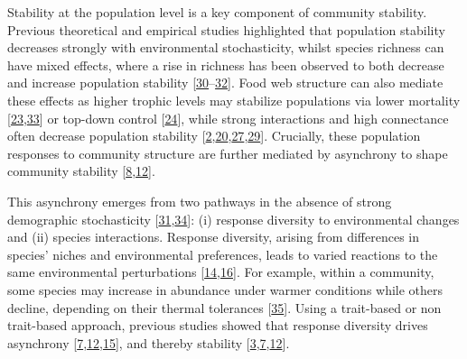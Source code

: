 \documentclass[
]{article}
\begin{document}
Stability at the population level is a key component of community stability.
Previous theoretical and empirical studies highlighted that population
stability decreases strongly with environmental stochasticity, whilst species
richness can have mixed effects, where a rise in richness has been observed to
both decrease and increase population stability {[}\protect\hyperlink{ref-tilman_biodiversity_2006}{30}--\protect\hyperlink{ref-houlahan_negative_2018}{32}{]}. Food web structure can
also mediate these effects as higher trophic levels may stabilize populations
via lower mortality {[}\protect\hyperlink{ref-brose_allometric_2006}{23},\protect\hyperlink{ref-hatton_linking_2019}{33}{]} or top-down
control {[}\protect\hyperlink{ref-shanafelt_stability_2018}{24}{]}, while strong interactions and high
connectance often decrease population stability {[}\protect\hyperlink{ref-may_will_1972}{2},\protect\hyperlink{ref-mccann_weak_1998}{20},\protect\hyperlink{ref-mccann_reevaluating_1997}{27},\protect\hyperlink{ref-thebault_trophic_2005}{29}{]}.
Crucially, these population responses to community structure are further
mediated by asynchrony to shape community stability
{[}\protect\hyperlink{ref-zhao_biodiversity_2022}{8},\protect\hyperlink{ref-thibaut_understanding_2013}{12}{]}.

This asynchrony emerges from two pathways in the absence of strong demographic
stochasticity {[}\protect\hyperlink{ref-loreau_biodiversity_2013}{31},\protect\hyperlink{ref-loreau_species_2008}{34}{]}: (i) response
diversity to environmental changes and (ii) species interactions. Response
diversity, arising from differences in species' niches and environmental
preferences, leads to varied reactions to the same environmental perturbations
{[}\protect\hyperlink{ref-elmqvist_response_2003}{14},\protect\hyperlink{ref-ross_how_2023}{16}{]}. For example, within a community,
some species may increase in abundance under warmer conditions while others
decline, depending on their thermal tolerances {[}\protect\hyperlink{ref-frund_response_2013}{35}{]}. Using a
trait-based or non trait-based approach, previous studies showed that response
diversity drives asynchrony {[}\protect\hyperlink{ref-thibaut_diversity_2012}{7},\protect\hyperlink{ref-thibaut_understanding_2013}{12},\protect\hyperlink{ref-sasaki_species_2019}{15}{]}, and thereby stability
{[}\protect\hyperlink{ref-yachi_biodiversity_1999}{3},\protect\hyperlink{ref-thibaut_diversity_2012}{7},\protect\hyperlink{ref-thibaut_understanding_2013}{12}{]}.
\end{document}
